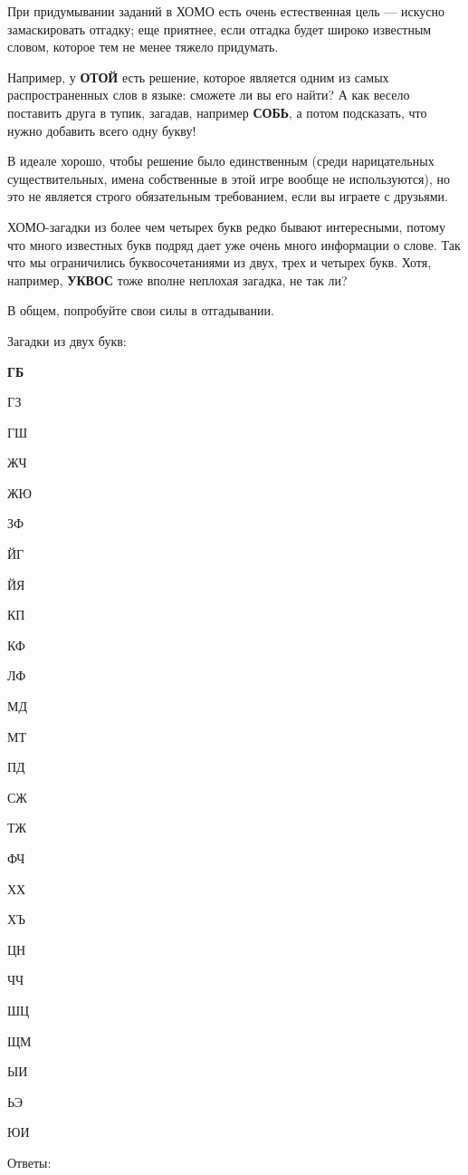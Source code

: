 При придумывании заданий в ХОМО есть очень естественная цель --- искусно замаскировать отгадку;
еще приятнее, если отгадка будет широко известным словом, которое тем не менее тяжело придумать. 

Например, у \textbf{ОТОЙ} есть решение, которое является одним из самых распространенных слов в языке: сможете ли вы его найти?
А как весело поставить друга в тупик, загадав, например \textbf{СОБЬ}, а потом подсказать, что нужно добавить всего одну букву! 

В идеале хорошо, чтобы решение было единственным (среди нарицательных существительных, имена собственные в этой игре вообще не используются), но это не является строго обязательным требованием, если вы играете с друзьями.

ХОМО-загадки из более чем четырех букв редко бывают интересными, потому что много известных букв подряд дает уже очень много информации о слове.
Так что мы ограничились буквосочетаниями из двух, трех и четырех букв.
Хотя, например, \textbf{УКВОС} тоже вполне неплохая загадка, не так ли?

В общем, попробуйте свои силы в отгадывании.

Загадки из двух букв:

\begin{multicols}{4}
{\bf
ГБ

ГЗ

ГШ

ЖЧ

ЖЮ

ЗФ

ЙГ

ЙЯ

КП

КФ

ЛФ

МД

МТ

ПД

СЖ

ТЖ

ФЧ

ХХ

ХЪ

ЦН

ЧЧ

ШЦ

ЩМ

ЫИ

ЬЭ

ЮИ
}
\end{multicols}

Ответы:

